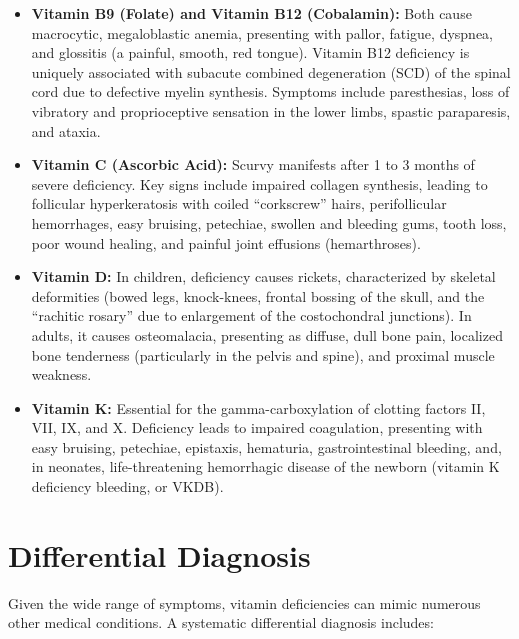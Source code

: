\begin{itemize}
    \item \textbf{Vitamin B9 (Folate) and Vitamin B12 (Cobalamin):} Both cause macrocytic, megaloblastic anemia, presenting with pallor, fatigue, dyspnea, and glossitis (a painful, smooth, red tongue). Vitamin B12 deficiency is uniquely associated with subacute combined degeneration (SCD) of the spinal cord due to defective myelin synthesis. Symptoms include paresthesias, loss of vibratory and proprioceptive sensation in the lower limbs, spastic paraparesis, and ataxia.

    \item \textbf{Vitamin C (Ascorbic Acid):} Scurvy manifests after 1 to 3 months of severe deficiency. Key signs include impaired collagen synthesis, leading to follicular hyperkeratosis with coiled ``corkscrew'' hairs, perifollicular hemorrhages, easy bruising, petechiae, swollen and bleeding gums, tooth loss, poor wound healing, and painful joint effusions (hemarthroses).

    \item \textbf{Vitamin D:} In children, deficiency causes rickets, characterized by skeletal deformities (bowed legs, knock-knees, frontal bossing of the skull, and the ``rachitic rosary'' due to enlargement of the costochondral junctions). In adults, it causes osteomalacia, presenting as diffuse, dull bone pain, localized bone tenderness (particularly in the pelvis and spine), and proximal muscle weakness.

    \item \textbf{Vitamin K:} Essential for the gamma-carboxylation of clotting factors II, VII, IX, and X. Deficiency leads to impaired coagulation, presenting with easy bruising, petechiae, epistaxis, hematuria, gastrointestinal bleeding, and, in neonates, life-threatening hemorrhagic disease of the newborn (vitamin K deficiency bleeding, or VKDB).
\end{itemize}

\section*{Differential Diagnosis}
Given the wide range of symptoms, vitamin deficiencies can mimic numerous other medical conditions. A systematic differential diagnosis includes:

